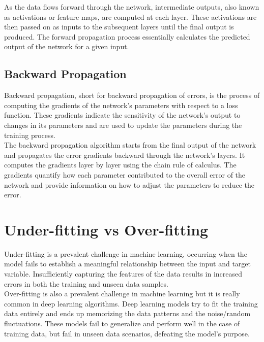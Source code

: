 As the data flows forward through the network, intermediate outputs, also known
as activations or feature maps, are computed at each layer. These activations
are then passed on as inputs to the subsequent layers until the final output is
produced. The forward propagation process essentially calculates the predicted
output of the network for a given input.

\subsection{Backward Propagation}

Backward propagation, short for backward propagation of errors, is the process
of computing the gradients of the network's parameters with respect to a loss
function. These gradients indicate the sensitivity of the network's output to
changes in its parameters and are used to update the parameters during the
training process. \\

The backward propagation algorithm starts from the final output of the network
and propagates the error gradients backward through the network's layers. It
computes the gradients layer by layer using the chain rule of calculus. The
gradients quantify how each parameter contributed to the overall error of the
network and provide information on how to adjust the parameters to reduce the
error.


\section{Under-fitting vs Over-fitting}

Under-fitting is a prevalent challenge in machine learning, occurring when the
model fails to establish a meaningful relationship between the input and target
variable. Insufficiently capturing the features of the data results in
increased errors in both the training and unseen data samples. \\

Over-fitting is also a prevalent challenge in machine learning but it is really
common in deep learning algorithms. Deep learning models try to fit the
training data entirely and ends up memorizing the data patterns and the
noise/random fluctuations. These models fail to generalize and perform well in
the case of training data, but fail in unseen data scenarios, defeating the
model's purpose.

